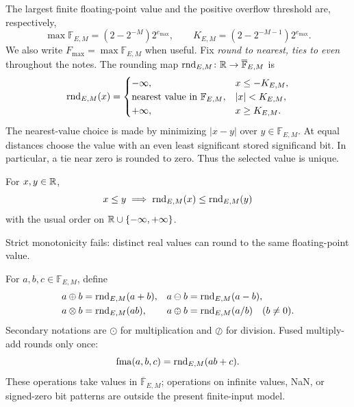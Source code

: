 \begin{definition}[Rounding]
The largest finite floating-point value and the positive overflow
threshold are, respectively,
\[
 \max\mathbb F_{E, M}=(2-2^{-M})2^{e_{\max}}, \qquad
 K_{E, M}=(2-2^{-M-1})2^{e_{\max}}.
\]
We also write $F_{\max}=\max\mathbb F_{E, M}$ when useful.
Fix \emph{round to nearest, ties to even} throughout the notes.
The rounding map
$\operatorname{rnd}_{E, M}\colon\mathbb{R}\to\overline{\mathbb F}_{E, M}$ is
\[
 \operatorname{rnd}_{E, M}(x)=
 \begin{cases}
 -\infty, &x\le-K_{E, M}, \\
 \text{nearest value in }\mathbb F_{E, M}, &|x|<K_{E, M}, \\
 +\infty, &x\ge K_{E, M}.
 \end{cases}
\]
The nearest-value choice is made by minimizing $|x-y|$ over
$y\in\mathbb F_{E, M}$. At equal distances choose the value
with an even least significant stored significand bit. In particular,
a tie near zero is rounded to zero. Thus the selected value is unique.
\end{definition}

\begin{proposition}
For $x, y\in\mathbb{R}$,
\[
 x\le y\implies\operatorname{rnd}_{E, M}(x)\le\operatorname{rnd}_{E, M}(y)
\]
with the usual order on $\mathbb{R}\cup\{-\infty, +\infty\}$.
\end{proposition}
Strict monotonicity fails: distinct real values can round to the
same floating-point value.

\begin{definition}
For $a, b, c\in\mathbb F_{E, M}$, define
\[
 \begin{aligned}
 a\oplus b&=\rnd_{E, M}(a+b), &
 a\ominus b&=\rnd_{E, M}(a-b), \\
 a\otimes b&=\rnd_{E, M}(ab), &
 a\odiv b&=\rnd_{E, M}(a/b)\quad(b\ne0).
 \end{aligned}
\]
Secondary notations are $\odot$ for multiplication and
$\oslash$ for division. Fused multiply-add rounds only once:
\[
 \operatorname{fma}(a, b, c)=\operatorname{rnd}_{E, M}(ab+c).
\]
These operations take values in $\overline{\mathbb F}_{E, M}$;
operations on infinite values, NaN, or signed-zero bit patterns
are outside the present finite-input model.
\end{definition}

